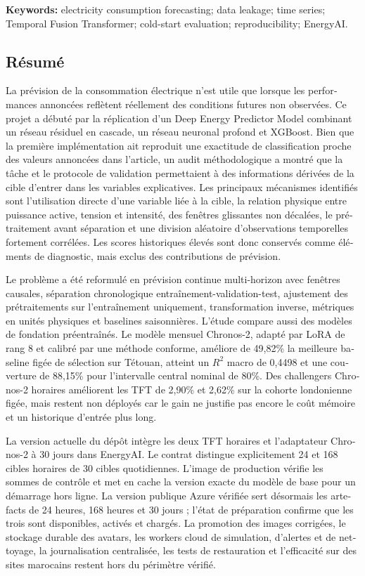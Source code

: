 \textbf{Keywords:} electricity consumption forecasting; data leakage; time series; Temporal Fusion Transformer; cold-start evaluation; reproducibility; EnergyAI.

\cleardoublepage
\begin{otherlanguage}{french}
\chapter*{Résumé}
\enlargethispage{4\baselineskip}

La prévision de la consommation électrique n'est utile que lorsque les performances annoncées reflètent réellement des conditions futures non observées. Ce projet a débuté par la réplication d'un Deep Energy Predictor Model combinant un réseau résiduel en cascade, un réseau neuronal profond et XGBoost. Bien que la première implémentation ait reproduit une exactitude de classification proche des valeurs annoncées dans l'article, un audit méthodologique a montré que la tâche et le protocole de validation permettaient à des informations dérivées de la cible d'entrer dans les variables explicatives. Les principaux mécanismes identifiés sont l'utilisation directe d'une variable liée à la cible, la relation physique entre puissance active, tension et intensité, des fenêtres glissantes non décalées, le prétraitement avant séparation et une division aléatoire d'observations temporelles fortement corrélées. Les scores historiques élevés sont donc conservés comme éléments de diagnostic, mais exclus des contributions de prévision.

Le problème a été reformulé en prévision continue multi-horizon avec fenêtres causales, séparation chronologique entraînement-validation-test, ajustement des prétraitements sur l'entraînement uniquement, transformation inverse, métriques en unités physiques et baselines saisonnières. L'étude compare aussi des modèles de fondation préentraînés. Le modèle mensuel Chronos-2, adapté par LoRA de rang 8 et calibré par une méthode conforme, améliore de 49,82\% la meilleure baseline figée de sélection sur Tétouan, atteint un $R^2$ macro de 0,4498 et une couverture de 88,15\% pour l'intervalle central nominal de 80\%. Des challengers Chronos-2 horaires améliorent les TFT de 2,90\% et 2,62\% sur la cohorte londonienne figée, mais restent non déployés car le gain ne justifie pas encore le coût mémoire et un historique d'entrée plus long.

La version actuelle du dépôt intègre les deux TFT horaires et l'adaptateur Chronos-2 à 30 jours dans EnergyAI. Le contrat distingue explicitement 24 et 168 cibles horaires de 30 cibles quotidiennes. L'image de production vérifie les sommes de contrôle et met en cache la version exacte du modèle de base pour un démarrage hors ligne. La version publique Azure vérifiée sert désormais les artefacts de 24 heures, 168 heures et 30 jours ; l'état de préparation confirme que les trois sont disponibles, activés et chargés. La promotion des images corrigées, le stockage durable des avatars, les workers cloud de simulation, d'alertes et de nettoyage, la journalisation centralisée, les tests de restauration et l'efficacité sur des sites marocains restent hors du périmètre vérifié.


\end{otherlanguage}
